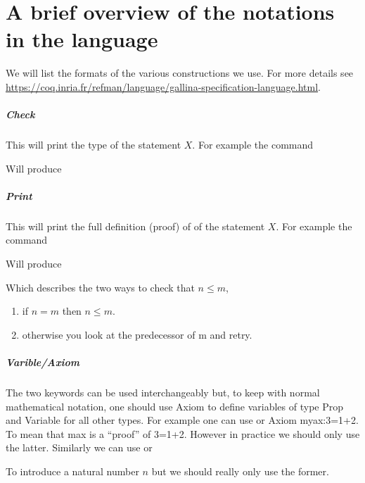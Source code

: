 \chapter{ A brief overview of the notations in the language}\label{ch:language}



We will list the formats of the various constructions we use. For more details see 
\url{https://coq.inria.fr/refman/language/gallina-specification-language.html}.
\paragraph{\bf Check}{

This will print the type of the statement $X$. For example the command

Will produce

}
\hrulefill
\paragraph{\bf Print}{


This will print the full definition (proof) of of the statement $X$. For example the command

Will produce

Which describes the two ways to check that $n\le m$,
\begin{enumerate}
\item if $n=m$ then $n \le m$.
\item otherwise you look at the predecessor of m and retry.
\end{enumerate}}
\hrulefill
\paragraph{\bf Varible/Axiom}
{

The two keywords can be used interchangeably but, to keep with normal mathematical notation, one should use Axiom to define variables of type Prop and Variable for all other types. For example one can use 
or {Axiom myax:3=1+2.}
To mean that max is a ``proof'' of 3=1+2. However in practice we should only use the latter. Similarly we can use
or 

To introduce a natural number $n$ but we should really only use the former.
}

